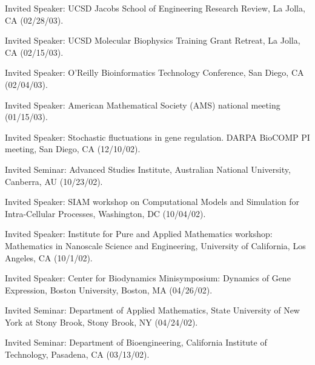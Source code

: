 \item  Invited Speaker: UCSD Jacobs School of Engineering
Research Review, La Jolla, CA (02/28/03).

\item  Invited Speaker: UCSD Molecular Biophysics Training
Grant Retreat, La Jolla, CA (02/15/03).

\item  Invited Speaker: O'Reilly Bioinformatics
Technology Conference, San Diego, CA (02/04/03).

\item Invited Speaker: American Mathematical Society (AMS) national
meeting (01/15/03).

\item Invited Speaker: Stochastic fluctuations in gene regulation.
DARPA BioCOMP PI meeting, San Diego, CA (12/10/02).

\item  Invited Seminar: Advanced Studies Institute, Australian National University, Canberra, AU (10/23/02).

\item Invited Speaker: SIAM workshop on Computational Models and
Simulation for Intra-Cellular Processes, Washington, DC
(10/04/02).

\item Invited Speaker: Institute for Pure and Applied Mathematics workshop: Mathematics
in Nanoscale Science and Engineering, University of California,
Los Angeles, CA (10/1/02).

\item Invited Speaker: Center for Biodynamics Minisymposium:
Dynamics of Gene Expression, Boston University, Boston, MA
(04/26/02).

\item Invited Seminar: Department of Applied Mathematics, State
University of New York at Stony Brook, Stony Brook, NY (04/24/02).

\item Invited Seminar: Department of Bioengineering, California
Institute of Technology, Pasadena, CA (03/13/02).

